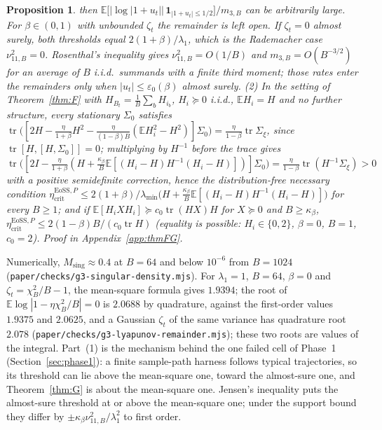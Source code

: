 \documentclass[11pt]{article}
\newtheorem{proposition}[theorem]{Proposition}
\theoremstyle{remark}
\newcommand{\etacrit}{\eta_{\mathrm{crit}}}
\newcommand{\E}{\mathbb{E}}
\newcommand{\tr}{\operatorname{tr}}
\begin{document}
\begin{proposition}
then $\E\big[|\log|1+u_t||\,\mathbf 1_{|1+u_t|\le1/2}\big]/m_{3,B}$ can be arbitrarily large. For $\beta\in(0,1)$ with unbounded $\zeta_t$ the remainder is left open. If $\zeta_t=0$ almost surely, both thresholds equal $2(1+\beta)/\lambda_1$, which is the Rademacher case $\nu_{11,B}^2=0$. Rosenthal's inequality gives $\nu_{11,B}^2=O(1/B)$ and $m_{3,B}=O(B^{-3/2})$ for an average of $B$ i.i.d.\ summands with a finite third moment; those rates enter the remainders only when $|u_t|\le\varepsilon_0(\beta)$ almost surely. (2) In the setting of Theorem~\ref{thm:F} with $H_{B_t}=\frac1B\sum_bH_{i_b}$, $H_i\succeq0$ i.i.d., $\E H_i=H$ and no further structure, every stationary $\Sigma_0$ satisfies $\tr\big([2H-\frac{\eta}{1+\beta}H^2-\frac{\eta}{(1-\beta)B}(\E H_i^2-H^2)]\Sigma_0\big)=\frac{\eta}{1-\beta}\tr\Sigma_\xi$, since $\tr[H,[H,\Sigma_0]]=0$; multiplying by $H^{-1}$ before the trace gives $\tr\big([2I-\frac{\eta}{1+\beta}(H+\frac{\kappa_\beta}{B}\E[(H_i-H)H^{-1}(H_i-H)])]\Sigma_0\big)=\frac{\eta}{1-\beta}\tr(H^{-1}\Sigma_\xi)>0$ with a positive semidefinite correction, hence the distribution-free necessary condition $\etacrit^{\mathrm{EoSS},P}\le2(1+\beta)/\lambda_{\min}\big(H+\frac{\kappa_\beta}{B}\E[(H_i-H)H^{-1}(H_i-H)]\big)$ for every $B\ge1$; and if $\E[H_iXH_i]\succeq c_0\tr(HX)H$ for $X\succeq0$ and $B\ge\kappa_\beta$, $\etacrit^{\mathrm{EoSS},P}\le2(1-\beta)B/(c_0\tr H)$ (equality is possible: $H_i\in\{0,2\}$, $\beta=0$, $B=1$, $c_0=2$). Proof in Appendix~\ref{app:thmFG}.
\end{proposition}
Numerically, $M_{\mathrm{sing}}\approx0.4$ at $B=64$ and below $10^{-6}$ from $B=1024$ (\texttt{paper/checks/g3-singular-density.mjs}). For $\lambda_1=1$, $B=64$, $\beta=0$ and $\zeta_t=\chi^2_B/B-1$, the mean-square formula gives $1.9394$; the root of $\E\log|1-\eta\chi^2_B/B|=0$ is $2.0688$ by quadrature, against the first-order values $1.9375$ and $2.0625$, and a Gaussian $\zeta_t$ of the same variance has quadrature root $2.078$ (\texttt{paper/checks/g3-lyapunov-remainder.mjs}); these two roots are values of the integral.
Part~(1) is the mechanism behind the one failed cell of Phase~1 (Section~\ref{sec:phase1}): a finite sample-path harness follows typical trajectories, so its threshold can lie above the mean-square one, toward the almost-sure one, and Theorem~\ref{thm:G} is about the mean-square one. Jensen's inequality puts the almost-sure threshold at or above the mean-square one; under the support bound they differ by $\pm\kappa_\beta\nu_{11,B}^2/\lambda_1^2$ to first order.
\end{document}
